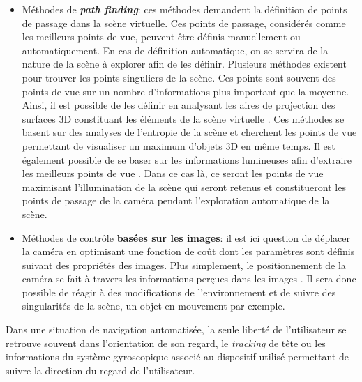 \begin{itemize}
	\item Méthodes de \textit{\textbf{path finding}}: ces méthodes demandent la définition de points de passage dans la scène virtuelle. Ces points de passage, considérés comme les meilleurs points de vue, peuvent être définis manuellement ou automatiquement. En cas de définition automatique, on se servira de la nature de la scène à explorer afin de les définir. Plusieurs méthodes existent pour trouver les points singuliers de la scène. Ces points sont souvent des points de vue sur un nombre d'informations plus important que la moyenne. Ainsi, il est possible de les définir en analysant les aires de projection des surfaces 3D constituant les éléments de la scène virtuelle \cite{vazquez2001viewpoint}. Ces méthodes se basent sur des analyses de l'entropie de la scène et cherchent les points de vue permettant de visualiser un maximum d'objets 3D en même temps. Il est également possible de se baser sur les informations lumineuses afin d'extraire les meilleurs points de vue \cite{gumhold2002maximum}. Dans ce cas là, ce seront les points de vue maximisant l'illumination de la scène qui seront retenus et constitueront les points de passage de la caméra pendant l'exploration automatique de la scène.
	\item Méthodes de contrôle \textbf{basées sur les images}: il est ici question de déplacer la caméra en optimisant une fonction de coût dont les paramètres sont définis suivant des propriétés des images. Plus simplement, le positionnement de la caméra se fait à travers les informations perçues dans les images \cite{courty2001computer}. Il sera donc possible de réagir à des modifications de l'environnement et de suivre des singularités de la scène, un objet en mouvement par exemple. 
\end{itemize}

Dans une situation de navigation automatisée, la seule liberté de l'utilisateur se retrouve souvent dans l'orientation de son regard, le \textit{tracking} de tête ou les informations du système gyroscopique associé au dispositif utilisé permettant de suivre la direction du regard de l'utilisateur.

